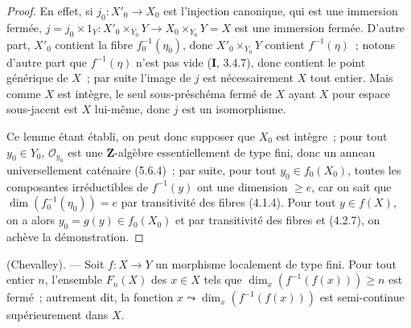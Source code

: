 \begin{proof}
En effet, si $j_0:X'_0\to X_0$ est l'injection canonique, qui est une immersion
fermée, $j=j_0\times 1_Y:X'_0\times_{Y_0}Y\to X_0\times_{Y_0}Y=X$ est une
immersion fermée. D'autre part, $X'_0$ contient la fibre
$f_0^{-1}(\eta_0)$, donc $X'_0\times_{Y_0}Y$ contient $f^{-1}(\eta)$~;
notons d'autre part que $f^{-1}(\eta)$ n'est pas vide (\textbf{I}, 3.4.7),
donc contient le point générique de $X$~; par suite l'image de $j$ est
nécessairement $X$ tout entier. Mais comme $X$ est intègre, le seul
sous-préschéma fermé de $X$ ayant $X$ pour espace sous-jacent est $X$
lui-même, donc $j$ est un isomorphisme.

Ce lemme étant établi, on peut donc supposer que $X_0$ est intègre~; pour tout
$y_0\in Y_0$, $\mathcal O_{y_0}$ est une $\mathbf Z$-algèbre essentiellement
de type fini, donc un anneau universellement
caténaire (5.6.4)~; par suite, pour tout $y_0\in f_0(X_0)$, toutes les
composantes irréductibles de $f^{-1}(y)$ ont une dimension $\geq e$, car on
sait que $\dim(f_0^{-1}(\eta_0))=e$ par transitivité des fibres (4.1.4). Pour
tout $y\in f(X)$, on a alors $y_0=g(y)\in f_0(X_0)$ et par transitivité des
fibres et (4.2.7), on achève la démonstration.
\end{proof}

\begin{theorem}[13.1.3]
\label{IV.13.1.3-fr}
\textnormal{(Chevalley).} --- Soit $f:X\to Y$ un morphisme localement de type
fini. Pour tout entier $n$, l'ensemble $F_n(X)$ des $x\in X$ tels que
$\dim_x(f^{-1}(f(x)))\geq n$ est fermé~; autrement dit, la fonction
$x\leadsto\dim_x(f^{-1}(f(x)))$ est semi-continue supérieurement dans $X$.
\end{theorem}

